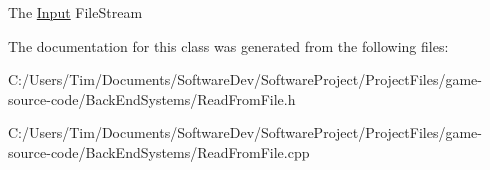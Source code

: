 The \hyperlink{class_input}{Input} File\+Stream 

The documentation for this class was generated from the following files\+:\begin{DoxyCompactItemize}
\item 
C\+:/\+Users/\+Tim/\+Documents/\+Software\+Dev/\+Software\+Project/\+Project\+Files/game-\/source-\/code/\+Back\+End\+Systems/Read\+From\+File.\+h\item 
C\+:/\+Users/\+Tim/\+Documents/\+Software\+Dev/\+Software\+Project/\+Project\+Files/game-\/source-\/code/\+Back\+End\+Systems/Read\+From\+File.\+cpp\end{DoxyCompactItemize}
